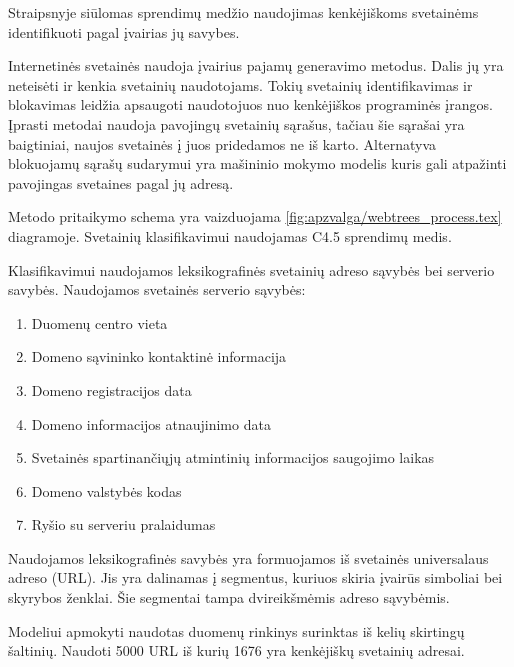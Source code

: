
Straipsnyje  siūlomas sprendimų medžio naudojimas kenkėjiškoms svetainėms identifikuoti pagal įvairias jų
savybes.


Internetinės svetainės naudoja įvairius pajamų generavimo metodus. Dalis jų yra neteisėti ir kenkia svetainių naudotojams.
Tokių svetainių identifikavimas ir blokavimas leidžia apsaugoti naudotojuos nuo kenkėjiškos programinės įrangos. Įprasti
metodai naudoja pavojingų svetainių sąrašus, tačiau šie sąrašai yra baigtiniai, naujos svetainės į juos pridedamos ne
iš karto. Alternatyva blokuojamų sąrašų sudarymui yra mašininio mokymo modelis kuris gali atpažinti pavojingas svetaines
pagal jų adresą.



Metodo pritaikymo schema yra vaizduojama \vref{fig:apzvalga/webtrees_process.tex} diagramoje. Svetainių klasifikavimui
naudojamas C4.5 sprendimų medis.

Klasifikavimui naudojamos leksikografinės svetainių adreso sąvybės bei serverio savybės. Naudojamos svetainės serverio sąvybės:
\begin{enumerate}[label=\arabic*.]
    \item Duomenų centro vieta
    \item Domeno sąvininko kontaktinė informacija
    \item Domeno registracijos data
    \item Domeno informacijos atnaujinimo data
    \item Svetainės spartinančiųjų atmintinių informacijos saugojimo laikas
    \item Domeno valstybės kodas
    \item Ryšio su serveriu pralaidumas
\end{enumerate}

Naudojamos leksikografinės savybės yra formuojamos iš svetainės universalaus adreso (URL). Jis yra dalinamas į segmentus,
kuriuos skiria įvairūs simboliai bei skyrybos ženklai. Šie segmentai tampa dvireikšmėmis adreso sąvybėmis.


Modeliui apmokyti naudotas duomenų rinkinys surinktas iš kelių skirtingų šaltinių. Naudoti 5000 URL iš kurių 1676 yra
kenkėjiškų svetainių adresai.

